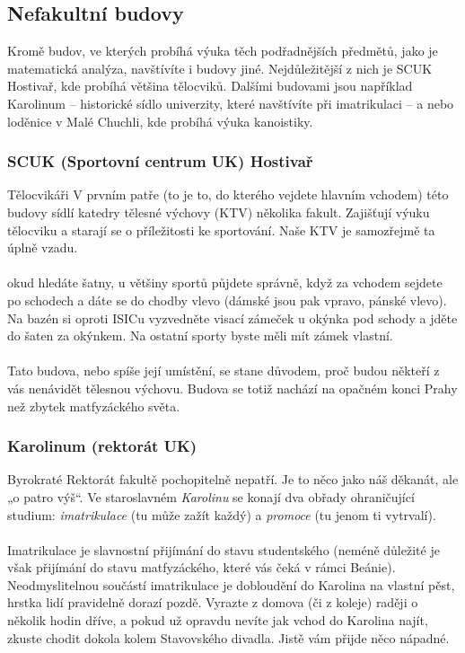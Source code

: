 \subsection{Nefakultní budovy}
Kromě budov, ve kterých probíhá výuka těch podřadnějších předmětů, jako je
matematická analýza, navštívíte i budovy jiné. Nejdůležitější z nich je SCUK
Hostivař, kde probíhá většina tělocviků. Dalšími budovami jsou například
Karolinum – historické sídlo univerzity, které navštívíte při imatrikulaci – a
nebo loděnice v Malé Chuchli, kde probíhá výuka kanoistiky.


\subsubsection{SCUK (Sportovní centrum UK) Hostivař}
{Tělocvikáři}
V prvním patře (to je to, do kterého vejdete hlavním vchodem) této budovy sídlí
katedry tělesné výchovy (KTV) několika fakult. Zajišťují výuku tělocviku a
starají se o příležitosti ke sportování. Naše KTV je samozřejmě ta úplně vzadu.
\\\\
okud hledáte šatny, u většiny sportů půjdete správně, když za vchodem sejdete
po schodech a dáte se do chodby vlevo (dámské jsou pak vpravo, pánské vlevo). Na
bazén si oproti ISICu vyzvedněte visací zámeček u okýnka pod schody a jděte do
šaten za okýnkem. Na ostatní sporty byste měli mít zámek vlastní.
\\\\
Tato budova, nebo spíše její umístění, se stane důvodem, proč budou někteří z
vás nenávidět tělesnou výchovu. Budova se totiž nachází na opačném konci Prahy
než zbytek matfyzáckého světa.


\subsubsection{Karolinum (rektorát UK)}
{Byrokraté}
Rektorát fakultě pochopitelně nepatří. Je to něco jako náš děkanát, ale „o patro
výš“. Ve staroslavném \textit{Karolinu} se konají dva obřady ohraničující
studium: \textit{imatrikulace} (tu může zažít každý) a \textit{promoce} (tu
jenom ti vytrvalí).
\\\\
Imatrikulace je slavnostní přijímání do stavu studentského (neméně důležité je
však přijímání do stavu matfyzáckého, které vás čeká v rámci Beánie).
Neodmyslitelnou součástí imatrikulace je dobloudění do Karolina na vlastní pěst,
hrstka lidí pravidelně dorazí pozdě. Vyrazte z domova (či z koleje) raději o
několik hodin dříve, a pokud už opravdu nevíte jak vchod do Karolina najít,
zkuste chodit dokola kolem Stavovského divadla. Jistě vám přijde něco nápadné.


